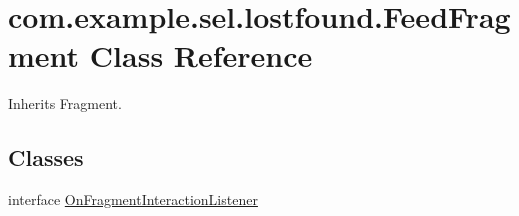\hypertarget{classcom_1_1example_1_1sel_1_1lostfound_1_1FeedFragment}{\section{com.\-example.\-sel.\-lostfound.\-Feed\-Fragment \-Class \-Reference}
\label{classcom_1_1example_1_1sel_1_1lostfound_1_1FeedFragment}
}


\-Inherits \-Fragment.

\subsection*{\-Classes}
\begin{DoxyCompactItemize}
\item 
interface \hyperlink{interfacecom_1_1example_1_1sel_1_1lostfound_1_1FeedFragment_1_1OnFragmentInteractionListener}{\-On\-Fragment\-Interaction\-Listener}
\end{DoxyCompactItemize}
